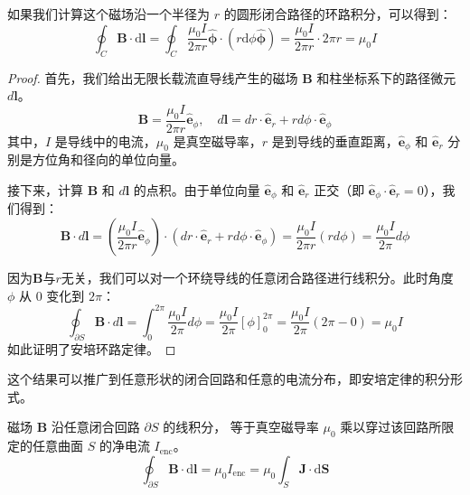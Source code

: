 \documentclass[fontset=none]{ctexart}
\begin{document}
如果我们计算这个磁场沿一个半径为 $r$ 的圆形闭合路径的环路积分，可以得到：
\begin{equation}
    \oint_C \bm{B} \cdot \mathrm{d}\bm{l} 
    = \oint_C \frac{\mu_0 I}{2\pi r} \hat{\bm{\phi}} \cdot (r \mathrm{d}\phi \hat{\bm{\phi}}) 
    = \frac{\mu_0 I}{2\pi r} \cdot 2\pi r = \mu_0 I
\end{equation}
\begin{proof}
    首先，我们给出无限长载流直导线产生的磁场 $\bm{B}$ 和柱坐标系下的路径微元 $d\bm{l}$。
\begin{equation}
    \bm{B} = \frac{\mu_0 I}{2\pi r} \hat{\bm{e}}_{\phi}, 
    \quad d\bm{l} = dr \cdot \hat{\bm{e}}_r + r d\phi \cdot \hat{\bm{e}}_{\phi}
\end{equation}
其中，$I$ 是导线中的电流，$\mu_0$ 是真空磁导率，$r$ 
是到导线的垂直距离，$\hat{\bm{e}}_{\phi}$ 和 $\hat{\bm{e}}_r$ 分别是方位角和径向的单位向量。

接下来，计算 $\bm{B}$ 和 $d\bm{l}$ 的点积。由于单位向量 $\hat{\bm{e}}_{\phi}$ 
和 $\hat{\bm{e}}_r$ 正交（即 $\hat{\bm{e}}_{\phi} \cdot \hat{\bm{e}}_r = 0$），我们得到：
\begin{equation}
    \bm{B} \cdot d\bm{l} = \left( \frac{\mu_0 I}{2\pi r} \hat{\bm{e}}_{\phi} \right) 
    \cdot \left( dr \cdot \hat{\bm{e}}_r + r d\phi \cdot \hat{\bm{e}}_{\phi} \right) 
    = \frac{\mu_0 I}{2\pi r} (r d\phi) = \frac{\mu_0 I}{2\pi} d\phi
\end{equation}

因为$\bm{B}$与$r$无关，我们可以对一个环绕导线的任意闭合路径进行线积分。此时角度 $\phi$ 从 $0$ 变化到 $2\pi$：
\begin{equation}
    \oint_{\partial S} \bm{B} \cdot d\bm{l} = \int_{0}^{2\pi} \frac{\mu_0 I}{2\pi} d\phi 
    = \frac{\mu_0 I}{2\pi} [\phi]_{0}^{2\pi} = \frac{\mu_0 I}{2\pi} (2\pi - 0) = \mu_0 I
\end{equation}
如此证明了安培环路定律。
\end{proof}

这个结果可以推广到任意形状的闭合回路和任意的电流分布，即安培定律的积分形式。
\begin{law}[安培环路定律]
    磁场 $\bm{B}$ 沿任意闭合回路 $\partial S$ 的线积分，
    等于真空磁导率 $\mu_0$ 乘以穿过该回路所限定的任意曲面 $S$ 的净电流 $I_{\text{enc}}$。
    \begin{equation}
        \oint_{\partial S} \bm{B} \cdot \mathrm{d}\bm{l} = \mu_0 I_{\text{enc}} 
        = \mu_0 \int_S \bm{J} \cdot \mathrm{d}\bm{S}
    \end{equation}
\end{law}
\end{document}
